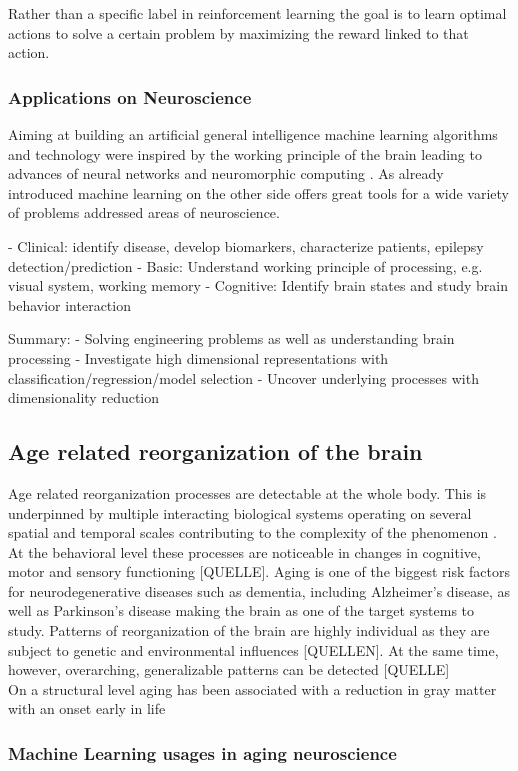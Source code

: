Rather than a specific label in reinforcement learning the goal is to learn optimal actions to solve a certain problem by maximizing the reward linked to that action.

\subsubsection{Applications on Neuroscience}
Aiming at building an artificial general intelligence machine learning algorithms and technology were inspired by the working principle of the brain leading to advances of neural networks \cite{Macpherson2021} and neuromorphic computing \cite{Choi2022}. As already introduced machine learning on the other side offers great tools for a wide variety of problems addressed areas of neuroscience. 

- Clinical: identify disease, develop biomarkers, characterize patients, epilepsy detection/prediction
- Basic: Understand working principle of processing, e.g. visual system, working memory
- Cognitive: Identify brain states and study brain behavior interaction

Summary: 
- Solving engineering problems as well as understanding brain processing 
- Investigate high dimensional representations with classification/regression/model selection 
- Uncover underlying processes with dimensionality reduction


\subsection{Age related reorganization of the brain}
\label{subsec:Aging}

Age related reorganization processes are detectable at the whole body. This is underpinned by multiple interacting biological systems operating on several spatial and temporal scales contributing to the complexity of the phenomenon \cite{Mooney2016}. At the behavioral level these processes are noticeable in changes in cognitive, motor and sensory functioning [QUELLE]. Aging is one of the biggest risk factors for neurodegenerative diseases such as dementia, including Alzheimer's disease, as well as Parkinson's disease making the brain as one of the target systems to study. Patterns of reorganization of the brain are highly individual as they are subject to genetic and environmental influences [QUELLEN]. At the same time, however, overarching, generalizable patterns can be detected [QUELLE]\\
On a structural level aging has been associated with a reduction in gray matter with an onset early in life 

\subsubsection{Machine Learning usages in aging neuroscience}
